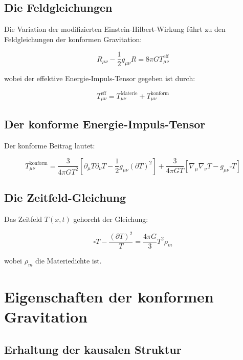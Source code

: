 \documentclass[12pt,a4paper]{report}
\begin{document}
	\subsection{Die Feldgleichungen}
	
	Die Variation der modifizierten Einstein-Hilbert-Wirkung führt zu den Feldgleichungen der konformen Gravitation:
	
	\begin{equation}
		R_{\mu\nu} - \frac{1}{2}g_{\mu\nu}R = 8\pi G T_{\mu\nu}^{\text{eff}}
	\end{equation}
	
	wobei der effektive Energie-Impuls-Tensor gegeben ist durch:
	
	\begin{equation}
		T_{\mu\nu}^{\text{eff}} = T_{\mu\nu}^{\text{Materie}} + T_{\mu\nu}^{\text{konform}}
	\end{equation}
	
	\subsection{Der konforme Energie-Impuls-Tensor}
	
	Der konforme Beitrag lautet:
	
	\begin{equation}
		T_{\mu\nu}^{\text{konform}} = \frac{3}{4\pi G T^2}[\partial_\mu T \partial_\nu T - \frac{1}{2}g_{\mu\nu}(\partial T)^2] + \frac{3}{4\pi G T}[\nabla_\mu\nabla_\nu T - g_{\mu\nu}\square T]
	\end{equation}
	
	\subsection{Die Zeitfeld-Gleichung}
	
	Das Zeitfeld $T(x,t)$ gehorcht der Gleichung:
	
	\begin{equation}
		\square T - \frac{(\partial T)^2}{T} = \frac{4\pi G}{3}T^2 \rho_m
	\end{equation}
	
	wobei $\rho_m$ die Materiedichte ist.
	
	\section{Eigenschaften der konformen Gravitation}
	
	\subsection{Erhaltung der kausalen Struktur}
	
\end{document}
